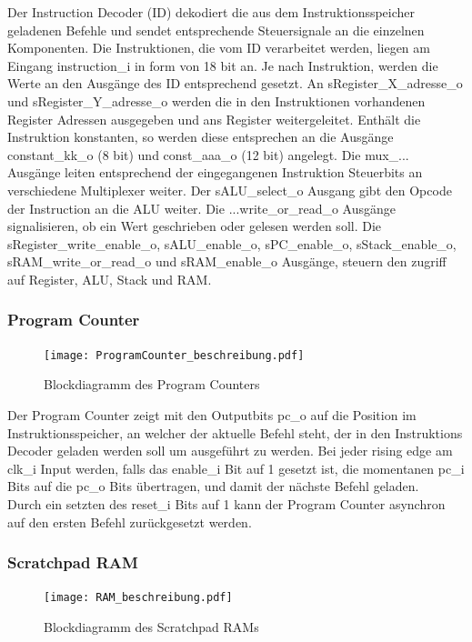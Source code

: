 \documentclass{scrartcl}
\begin{document}
Der Instruction Decoder (ID) dekodiert die aus dem Instruktionsspeicher geladenen Befehle und sendet entsprechende Steuersignale an die einzelnen Komponenten. Die Instruktionen, die vom ID verarbeitet werden, liegen am Eingang instruction\_i in form von 18 bit an. Je nach Instruktion, werden die Werte an den Ausgänge des ID entsprechend gesetzt. An sRegister\_X\_adresse\_o und sRegister\_Y\_adresse\_o werden die in den Instruktionen vorhandenen Register Adressen ausgegeben und ans Register weitergeleitet.
Enthält die Instruktion konstanten, so werden diese entsprechen an die Ausgänge constant\_kk\_o (8 bit) und const\_aaa\_o (12 bit) angelegt. Die mux\_... Ausgänge leiten entsprechend der eingegangenen Instruktion Steuerbits an verschiedene Multiplexer weiter. Der sALU\_select\_o Ausgang gibt den Opcode der Instruction an die ALU weiter. Die ...write\_or\_read\_o Ausgänge signalisieren, ob ein Wert geschrieben oder gelesen werden soll. Die sRegister\_write\_enable\_o, sALU\_enable\_o, sPC\_enable\_o, sStack\_enable\_o, sRAM\_write\_or\_read\_o und sRAM\_enable\_o Ausgänge, steuern den zugriff auf Register, ALU, Stack und RAM.


\subsubsection{Program Counter}
\begin{figure}[H]
    \centering
    \texttt{[image: ProgramCounter\_beschreibung.pdf]}
    \caption{Blockdiagramm des Program Counters}
    \label{fig:Block_ProgramCounter}
\end{figure}


Der Program Counter zeigt mit den Outputbits pc\_o auf die Position im Instruktionsspeicher, an welcher der aktuelle Befehl steht, der in den Instruktions Decoder geladen werden soll um ausgeführt zu werden. Bei jeder rising edge am clk\_i Input werden, falls das enable\_i Bit auf 1 gesetzt ist, die momentanen pc\_i Bits auf die pc\_o Bits übertragen, und damit der nächste Befehl geladen. \\
Durch ein setzten des reset\_i Bits auf 1 kann der Program Counter asynchron auf den ersten Befehl zurückgesetzt werden.


\subsubsection{Scratchpad RAM}
\begin{figure}[H]
    \centering
    \texttt{[image: RAM\_beschreibung.pdf]}
    \caption{Blockdiagramm des Scratchpad RAMs}
    \label{fig:Block_ScratchpadRAM}
\end{figure}
\end{document}
